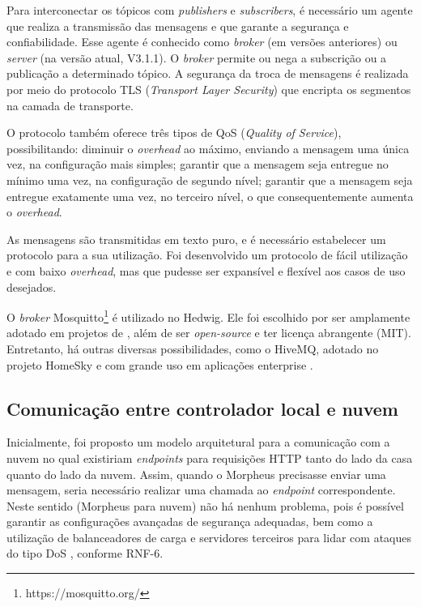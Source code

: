 Para interconectar os tópicos com \textit{publishers} e \textit{subscribers}, é necessário um agente que realiza a transmissão das mensagens e que garante a segurança e confiabilidade. Esse agente é conhecido como \emph{broker} (em versões anteriores) ou \emph{server} (na versão atual, V3.1.1). O \textit{broker} permite ou nega a subscrição ou a publicação a determinado tópico. A segurança da troca de mensagens é realizada por meio do protocolo TLS (\textit{Transport Layer Security}) que encripta os segmentos na camada de transporte.

O protocolo \wmqtt{} também oferece três tipos de QoS (\textit{Quality of Service}), possibilitando: diminuir o \emph{overhead} ao máximo, enviando a mensagem uma única vez, na configuração mais simples; garantir que a mensagem seja entregue no mínimo uma vez, na configuração de segundo nível; garantir que a mensagem seja entregue exatamente uma vez, no terceiro nível, o que consequentemente aumenta o \emph{overhead}.

As mensagens são transmitidas em texto puro, e é necessário estabelecer um protocolo para a sua utilização. Foi desenvolvido um protocolo de fácil utilização e com baixo \emph{overhead}, mas que pudesse ser expansível e flexível aos casos de uso desejados.

O \textit{broker} Mosquitto\footnote{https://mosquitto.org/} é utilizado no Hedwig. Ele foi escolhido por ser amplamente adotado em projetos de \wiot{}, além de ser \emph{open-source} e ter licença abrangente (MIT). Entretanto, há outras diversas possibilidades, como o HiveMQ, adotado no projeto HomeSky e com grande uso em aplicações enterprise \cite{hiveMq}.

\subsection{Comunicação entre controlador local e nuvem}

Inicialmente, foi proposto um modelo arquitetural para a comunicação com a nuvem no qual existiriam \emph{endpoints} para requisições HTTP tanto do lado da casa quanto do lado da nuvem. Assim, quando o Morpheus precisasse enviar uma mensagem, seria necessário realizar uma chamada ao \emph{endpoint} correspondente. Neste sentido (Morpheus para nuvem) não há nenhum problema, pois é possível garantir as configurações avançadas de segurança adequadas, bem como a utilização de balanceadores de carga e servidores terceiros para lidar com ataques do tipo DoS \cite{akamai}, conforme RNF-6.

